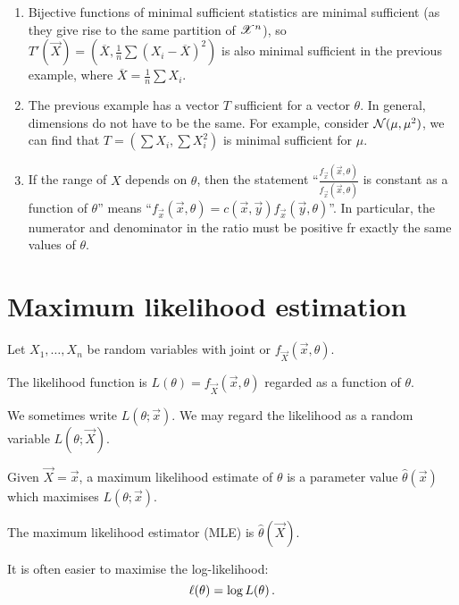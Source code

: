 \begin{enumerate}
\item Bijective functions of minimal sufficient statistics are minimal sufficient (as they give rise to the same partition of $\mathscr{X}^n$), so $T'(\vec{X}) = \left(\overline{X}, \frac{1}{n}\sum(X_i - \overline{X})^2\right)$ is also minimal sufficient in the previous example, where $\overline{X} = \frac{1}{n}\sum X_i$.
\item The previous example has a vector $T$ sufficient for a vector $\theta$. In general, dimensions do not have to be the same. For example, consider $\mathcal{N}(\mu, \mu^2)$, we can find that $T = \left(\sum X_i, \sum X_i^2\right)$ is minimal sufficient for $\mu$.
\item If the range of $X$ depends on $\theta$, then the statement ``$\frac{f_{\vec{x}}(\vec{x}, \theta)}{f_{\vec{x}}(\vec{x}, \theta)}$ is constant as a function of $\theta$'' means ``$f_{\vec{x}} (\vec{x}, \theta) = c(\vec{x}, \vec{y})f_{\vec{x}}(\vec{y}, \theta)$''. In particular, the numerator and denominator in the ratio must be positive fr exactly the same values of $\theta$.
\end{enumerate}

\section{Maximum likelihood estimation}
Let $X_1, \dotsc, X_n$ be random variables with joint \pdf or \pmf $f_{\vec{X}}(\vec{x}, \theta)$.

\begin{definition}
  The likelihood function is $L(\theta) = f_{\vec{X}}(\vec{x}, \theta)$ regarded as a function of $\theta$.
\end{definition}

We sometimes write $L(\theta; \vec{x})$. We may regard the likelihood as a random variable $L(\theta; \vec{X})$.

\begin{definition}
  Given $\vec{X} = \vec{x}$, a maximum likelihood estimate of $\theta$ is a parameter value $\hat{\theta}(\vec{x})$ which maximises $L(\theta; \vec{x})$.

  The maximum likelihood estimator (MLE) is $\hat{\theta}(\vec{X})$.
\end{definition}

It is often easier to maximise the log-likelihood:
\[
\ell(\theta) = \log L(\theta) \, {.}
\]

